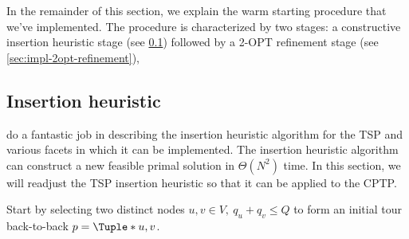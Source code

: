 \medskip

In the remainder of this section,
we explain the warm starting procedure that we've implemented.
The procedure is characterized by two stages:
a constructive insertion heuristic stage (see \cref{sec:impl-insertion-heuristic})
followed by a 2-OPT refinement stage (see \cref{sec:impl-2opt-refinement}),

\subsection{Insertion heuristic}
\label{sec:impl-insertion-heuristic}

\cite{rosenkrantz1977} do a fantastic job in describing the insertion heuristic algorithm
for the TSP and various facets in which it can be implemented.
The insertion heuristic algorithm
can construct a new feasible primal solution in $\Theta(N^2)$ time.
In this section,
we will readjust the TSP insertion heuristic
so that it can be applied to the CPTP.

\medskip

Start by selecting two distinct nodes $u, v \in V,\ q_u + q_v \le Q$
to form an initial tour back-to-back $p = \Tuple*{u, v}$.

